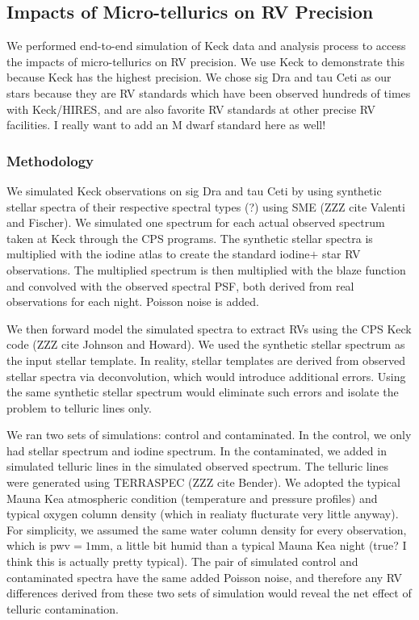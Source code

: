 \subsection{Impacts of Micro-tellurics on RV Precision}\label{keck:telluric:method}

We performed end-to-end simulation of Keck data and analysis process
to access the impacts of micro-tellurics on RV precision. We use Keck
to demonstrate this because Keck has the highest precision. We chose
sig Dra and tau Ceti as our stars because they are RV standards which
have been observed hundreds of times with Keck/HIRES, and are also
favorite RV standards at other precise RV facilities. I really want to
add an M dwarf standard here as well!


\subsubsection{Methodology}

We simulated Keck observations on sig Dra and tau Ceti by using
synthetic stellar spectra of their respective spectral types (?) using
SME (ZZZ cite Valenti and Fischer). We simulated one spectrum for each
actual observed spectrum taken at Keck through the CPS programs. The
synthetic stellar spectra is multiplied with the iodine atlas to
create the standard iodine$+$ star RV observations. The multiplied
spectrum is then multiplied with the blaze function and convolved with
the observed spectral PSF, both derived from real observations for
each night. Poisson noise is added.

We then forward model the simulated spectra to extract RVs using the
CPS Keck code (ZZZ cite Johnson and Howard). We used the synthetic
stellar spectrum as the input stellar template. In reality, stellar
templates are derived from observed stellar spectra via deconvolution,
which would introduce additional errors. Using the same synthetic
stellar spectrum would eliminate such errors and isolate the problem
to telluric lines only.

We ran two sets of simulations: control and contaminated. In the
control, we only had stellar spectrum and iodine spectrum. In the
contaminated, we added in simulated telluric lines in the simulated
observed spectrum. The telluric lines were generated using TERRASPEC
(ZZZ cite Bender). We adopted the typical Mauna Kea atmospheric
condition (temperature and pressure profiles) and typical oxygen
column density (which in realiaty flucturate very little anyway). For
simplicity, we assumed the same water column density for every
observation, which is pwv$=1$mm, a little bit humid than a typical
Mauna Kea night (true? I think this is actually pretty typical). The
pair of simulated control and contaminated spectra have the same added
Poisson noise, and therefore any RV differences derived from these two
sets of simulation would reveal the net effect of telluric
contamination.


